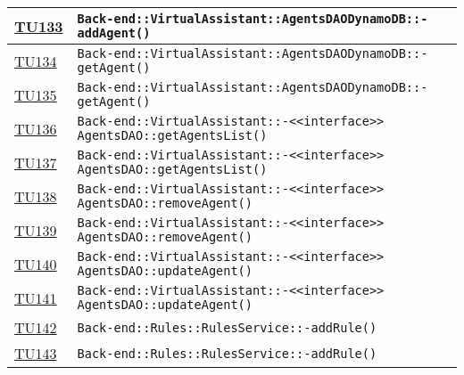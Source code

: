 \begin{longtable}{|>{\centering}m{1cm}|m{12cm}<{\centering}|}
\hyperlink{TU133}{TU133} & \texttt{Back-end::VirtualAssistant::AgentsDAODynamoDB::-\linebreak addAgent()}\\ \hline

\hyperlink{TU134}{TU134} & \texttt{Back-end::VirtualAssistant::AgentsDAODynamoDB::-\linebreak getAgent()}\\ \hline

\hyperlink{TU135}{TU135} & \texttt{Back-end::VirtualAssistant::AgentsDAODynamoDB::-\linebreak getAgent()}\\ \hline

\hyperlink{TU136}{TU136} & \texttt{Back-end::VirtualAssistant::-\linebreak <<interface>> AgentsDAO::getAgentsList()}\\ \hline

\hyperlink{TU137}{TU137} & \texttt{Back-end::VirtualAssistant::-\linebreak <<interface>> AgentsDAO::getAgentsList()}\\ \hline

\hyperlink{TU138}{TU138} & \texttt{Back-end::VirtualAssistant::-\linebreak <<interface>> AgentsDAO::removeAgent()}\\ \hline

\hyperlink{TU139}{TU139} & \texttt{Back-end::VirtualAssistant::-\linebreak <<interface>> AgentsDAO::removeAgent()}\\ \hline

\hyperlink{TU140}{TU140} & \texttt{Back-end::VirtualAssistant::-\linebreak <<interface>> AgentsDAO::updateAgent()}\\ \hline

\hyperlink{TU141}{TU141} & \texttt{Back-end::VirtualAssistant::-\linebreak <<interface>> AgentsDAO::updateAgent()}\\ \hline

\hyperlink{TU142}{TU142} & \texttt{Back-end::Rules::RulesService::-\linebreak addRule()}\\ \hline

\hyperlink{TU143}{TU143} & \texttt{Back-end::Rules::RulesService::-\linebreak addRule()}\\ \hline


\end{longtable}
